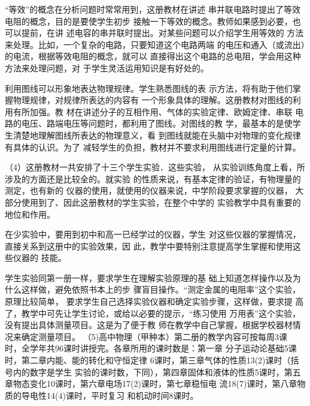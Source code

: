 “等效”的概念在分析问题时常常用到，这册教材在讲述
串并联电路时提出了等效电阻的概念，目的是要使学生初步
接触一下等效的概念。教师如果感到必要，也可以提前，在讲
述电容的串并联时提出。对某些问题可以介绍学生用等效的
方法来处理。比如，一个复杂的电路，只要知道这个电路两端
的电压和通入（或流出）的电流，根据等效电阻的概念，就可以
直接得出这个电路的总电阻，学会用这种方法来处理问题，对
于学生灵活运用知识是有好处的。

利用图线可以形象地表达物理规律。学生熟悉图线的表
示方法，将有助于他们掌握物理规律，对规律所表达的内容有
一个形象具体的理解。这册教材对图线的利用有所加强。教
材在讲述分子的互相作用、气体的实验定律、欧姆定律、串联
电路的电压、路端电压等问题时，都利用了图线。对图线的教
学，最基本的是使学生清楚地理解图线所表达的物理意义，看
到图线就能在头脑中对物理的变化规律有具体的认识。为了
减轻学生的负担，教材并不要求利用图线进行定量的计算。

（4）这册教材一共安排了十三个学生实验．这些实验，
从实验训练角度上看，所涉及的方面还是比较全的。就实验
的性质来说，有基本定律的验证，有物理量的测定，也有新的
仪器的使用，就使用的仪器来说，中学阶段要求掌握的仪器，
大部分使用到了、因此这册教材的学生实验，在整个中学的
实验教学中具有重要的地位和作用。

在少实验中，要用到初中和高一已经学过的仪器，学生
对这些仪器的掌握情况，直接关系到这册中的实验效果，因
此，教学中要特别注意提高学生掌握和使用这些仪器的
技能。

学生实验同第一册一样，要求学生在理解实验原理的基
础上知道怎样操作以及为什么这样做，避免依照书本上的步
骤盲目操作。“测定金属的电阻率”这个实验，原理比较简单，
要求学生自己选择实验仪器和确定实验步骤，这样做，要求提
高了，教学中可先让学生讨论，或给以必要的提示，“练习使用
万用表”这个实验，没有提出具体测量项目。这是为了便于教
师在教学中自己掌握，根据学校器材情况来确定测量项目。
（5)高中物理（甲种本）第二册的教学内容可按每周3课
时，全学年共96课时讲授完。各章所用的课时数是：第一章
分子运动论基础5课时，第二章内能、能的转化和守恒定律
6课时，第三章气体的性质13(2)课时（括号内的数字是学生
实验的课时数，下同），第四章固体和液体的性质5课时，第五
章物态变化10课时，第六章电场17(2)课时，第七章稳恒电
流18(7)课时，第八章物质的导电性14(4)课时，平时复习
和机动时间8课时。




































